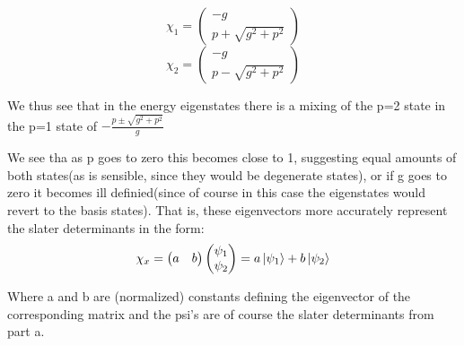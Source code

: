 \documentclass[11pt]{article} %
\begin{document}
\begin{equation}
\chi_1 =\left( \begin{matrix} -g \\ p+\sqrt{g^2+p^2}\end{matrix}\right)
\end{equation}
\begin{equation}
\chi_2 =\left( \begin{matrix} -g \\ p-\sqrt{g^2+p^2}\end{matrix}\right)
\end{equation}

We thus see that in the energy eigenstates there is a mixing of the p=2 state in the p=1 state of $-\frac{p\pm\sqrt{g^2+p^2}}{g}$

We see tha as p goes to zero this becomes close to 1, suggesting equal amounts of both states(as is sensible, since they would be degenerate states), or if g goes to zero it becomes ill definied(since of course in this case the eigenstates would revert to the basis states). That is, these eigenvectors more accurately represent the slater determinants in the form:\\

\begin{equation}
\chi_x=\left( \begin {matrix} a & b \end{matrix} \right)\left(\begin{matrix} \psi_1 \\ \psi_2 \end{matrix} \right)=a\ket{\psi_1}+b\ket{\psi_2}
\end{equation}

Where a and b are (normalized) constants defining the eigenvector of the corresponding matrix and the psi's are of course the slater determinants from part a.
\end{document}
